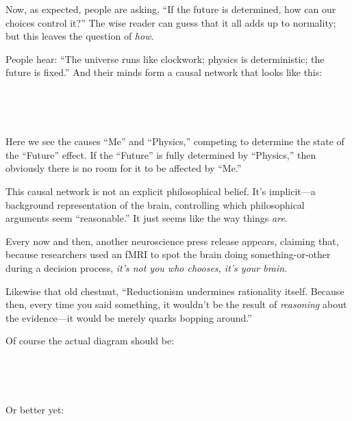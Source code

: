 {
 Now, as expected, people are asking, ``If the
future is determined, how can our choices control
it?'' The wise reader can guess that it all adds up
to normality; but this leaves the question of \textit{how}.}

{
 People hear: ``The universe runs like clockwork;
physics is deterministic; the future is fixed.'' And
their minds form a causal network that looks like this:}

{
 ~}

{\centering
{}
 
\par}


\bigskip

{
 ~}

{
 Here we see the causes ``Me''
and ``Physics,'' competing to
determine the state of the
``Future'' effect. If the
``Future'' is fully determined by
``Physics,'' then obviously there is
no room for it to be affected by
``Me.''}

{
 This causal network is not an explicit philosophical belief.
It's implicit---a background representation of the
brain, controlling which philosophical arguments seem
``reasonable.'' It just seems like
the way things \textit{are}.}

{
 Every now and then, another neuroscience press release appears,
claiming that, because researchers used an fMRI to spot the brain doing
something-or-other during a decision process,
\textit{it's not you who chooses, it's
your brain}.}

{
 Likewise that old chestnut, ``Reductionism
undermines rationality itself. Because then, every time you said
something, it wouldn't be the result of
\textit{reasoning} about the evidence---it would be merely quarks
bopping around.''}

{
 Of course the actual diagram should be:}

{
 ~}

{\centering
{}
 
\par}


\bigskip

{
 ~}

{
 Or better yet:}

{
 ~}

{\centering
{}
 
\par}



